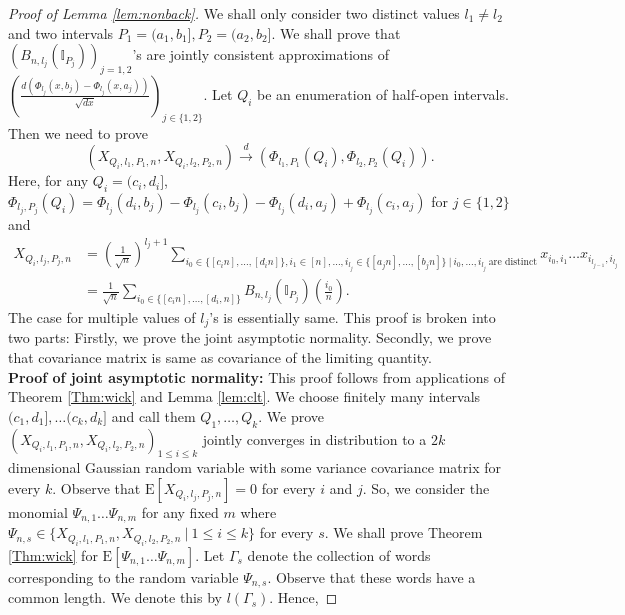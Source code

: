 \documentclass[reqno,12pt]{amsart}
\theoremstyle{plain}
\theoremstyle{definition}
\begin{document}
\begin{proof}[Proof of Lemma \ref{lem:nonback}]
    We shall only consider two distinct values $l_{1}\neq l_{2}$ and two intervals $P_{1}=(a_{1},b_{1}],P_{2}=(a_{2},b_{2}]$. We shall prove that $\left(B_{n,l_{j}}(\mathbb{I}_{P_{j}})\right)_{j=1,2}$'s are jointly consistent approximations of $\left( \frac{d(\Phi_{l_{j}}(x,b_{j})- \Phi_{l_{j}}(x,a_{j}))}{\sqrt{dx}} \right)_{j\in \{ 1,2\}}$. 
    Let $Q_{i}$ be an enumeration of half-open intervals. Then we need to prove 
    \begin{equation}
        \left( X_{Q_{i},l_{1},P_{1},n},X_{Q_{i},l_{2},P_{2},n} \right) \stackrel{d}{\to}\left(  \Phi_{l_{1},P_{1}}(Q_{i}), \Phi_{l_{2},P_{2}}(Q_{i})\right).
    \end{equation}
    Here, for any $Q_{i}=(c_{i},d_{i}]$, $\Phi_{l_{j},P_j}(Q_{i})= \Phi_{l_{j}}(d_{i},b_{j})- \Phi_{l_{j}}(c_{i},b_{j})- \Phi_{l_{j}}(d_{i},a_{j})+ \Phi_{l_{j}}(c_{i},a_{j})$ for $j \in \{ 1,2 \}$ and 
    \begin{equation*}
       \begin{split}
        X_{Q_{i},l_{j},P_{j},n} &= \left( \frac{1}{\sqrt{n}} \right)^{l_{j}+1} \sum_{i_{0} \in \{[c_{i}n],\ldots, [d_{i}n]\},i_{1}\in [n],\ldots, i_{l_{j}} \in \{ [a_{j}n],\ldots, [b_{j}n] \}~|~ i_{0},\ldots,i_{l_{j}} ~ \text{are distinct}} x_{i_{0},i_{1}}\ldots x_{i_{l_{j-1}},i_{l_{j}}}\\
        &= \frac{1}{\sqrt{n}} \sum_{ i_{0} \in \{ [c_{i}n],\ldots, [d_{i},n] \}} B_{n,l_{j}}(\mathbb{I}_{P_{j}})\left(  \frac{i_{0}}{n}\right).
        \end{split}
    \end{equation*}
The case for multiple values of $l_{j}$'s is essentially same. This proof is broken into two parts: Firstly, we prove the joint asymptotic normality. Secondly, we prove that covariance matrix is same as covariance of the limiting quantity.\\
\textbf{Proof of joint asymptotic normality:} This proof follows from applications of Theorem \ref{Thm:wick} and Lemma \ref{lem:clt}. We choose finitely many intervals $(c_{1},d_{1}],\ldots (c_{k},d_{k}]$ and call them $Q_{1},\ldots, Q_{k}$. We prove 
$\left(X_{Q_{i},l_{1},P_{1},n},X_{Q_{i},l_{2},P_{2},n}\right)_{1 \le i \le k}$ jointly converges in distribution to a $2k$ dimensional Gaussian random variable with some variance covariance matrix for every $k$. Observe that $\mathrm{E}[X_{Q_{i},l_{j},P_{j},n}]=0$ for every $i$ and $j$. So, we consider the monomial 
$\Psi_{n,1}\ldots \Psi_{n,m}$ for any fixed $m$ where $\Psi_{n,s} \in \{ X_{Q_{i},l_{1},P_{1},n},X_{Q_{i},l_{2},P_{2},n} ~|~ 1 \le i \le k\} $ for every $s$. We shall prove Theorem \ref{Thm:wick} for $\mathrm{E}\left[ \Psi_{n,1}\ldots \Psi_{n,m} \right]$. Let $\Gamma_{s}$ denote the collection of words corresponding to the random variable $\Psi_{n,s}$. Observe that these words have a common length. We denote this by $l(\Gamma_{s})$. Hence, 

\end{proof}
\end{document}
